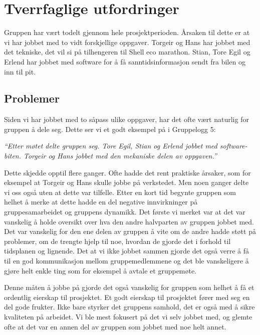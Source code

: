 
\section{Tverrfaglige utfordringer}
Gruppen har vært todelt gjennom hele prosjektperioden. Årsaken til dette er at vi har jobbet med to vidt forskjellige oppgaver. Torgeir og Hans har jobbet med det tekniske, det vil si på tilhengeren til Shell eco marathon. Stian, Tore Egil og Erlend har jobbet med software for å få sanntidsinformasjon sendt fra bilen og inn til pit.

\subsection{Problemer}
Siden vi har jobbet med to såpass ulike oppgaver, har det ofte vært naturlig for gruppen å dele seg. Dette ser vi et godt eksempel på i Gruppelogg 5: \newline

\emph{``Etter møtet delte gruppen seg. Tore Egil, Stian og Erlend jobbet med software-biten. Torgeir
og Hans jobbet med den mekaniske delen av oppgaven.''}\newline

Dette skjedde opptil flere ganger. Ofte hadde det rent praktiske årsaker, som for eksempel at Torgeir og Hans skulle jobbe på verkstedet. Men noen ganger delte vi oss også uten at dette var tilfelle. Etter en kort tid begynte gruppen som helhet å merke at dette hadde en del negative innvirkninger på gruppesamarbeidet og gruppens dynamikk. 
Det første vi merket var at det var vanskelig å holde oversikt over hva den andre halvparten av gruppen jobbet med. Det var vanskelig for den ene delen av gruppen å vite om de andre hadde støtt på problemer, om de trengte hjelp til noe, hvordan de gjorde det i forhold til tidsplanen og lignende. Det at vi ikke jobbet sammen gjorde det også verre å få til en god kommunikasjon mellom gruppemedlemmene og det ble vanskeligere å gjøre helt enkle ting som for eksempel å avtale et gruppemøte. \newline

Denne måten å jobbe på gjorde det også vanskelig for gruppen som helhet å få et ordentlig eierskap til prosjektet. Et godt eierskap til prosjektet fører med seg en del gode frukter. Ikke bare styrker det gruppens samhold, det er også med å sikre kvaliteten på arbeidet. Vi ble mest fokusert på det vi selv jobbet med, og glemte ofte at det var en annen del av gruppen som jobbet med noe helt annet. 

